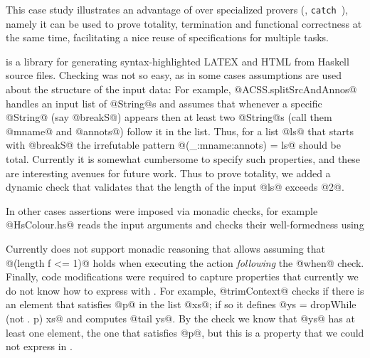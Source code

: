 This case study illustrates an advantage of \toolname over specialized provers 
(\eg, \texttt{catch}~\citep{catch}), namely it can be used to prove totality, termination and
functional correctness at the same time, facilitating a nice reuse of
specifications for multiple tasks.

\mypara{\lbhscolour} is a library for generating syntax-highlighted LATEX and HTML from
Haskell source files.
Checking \lbhscolour was not so easy, as in some cases assumptions are used about the 
structure of the input data:
%
For example, @ACSS.splitSrcAndAnnos@ handles an
input list of @String@s and assumes that whenever
a specific @String@ (say @breakS@) appears then 
at least two @String@s (call them @mname@ and @annots@)
follow it in the list.
Thus, for a list @ls@ that starts with @breakS@ 
the irrefutable pattern  @(_:mname:annots) = ls@
should be total.
%
Currently it is somewhat cumbersome to specify such 
properties, and these are interesting avenues for future work.
%
Thus to prove totality, we added a dynamic check that 
validates that the length of the input @ls@ exceeds @2@.


In other cases assertions were imposed via monadic checks, 
for example @HsColour.hs@ reads the input arguments and 
checks their well-formedness using 
%
%
Currently \toolname does not support monadic reasoning that 
allows assuming that @(length f <= 1)@
holds when executing the action \emph{following} the @when@ check. 
%
Finally, code modifications were required to capture properties 
that currently we do not know how to express with \toolname.
%
For example, @trimContext@ checks if there is an element that 
satisfies @p@ in the list @xs@; if so it defines 
%
@ys = dropWhile (not . p) xs@
%
and computes @tail ys@.
%
By the check we know that @ys@ has at least one element, the 
one that satisfies @p@, but this is a property that we could 
not express in \toolname.

